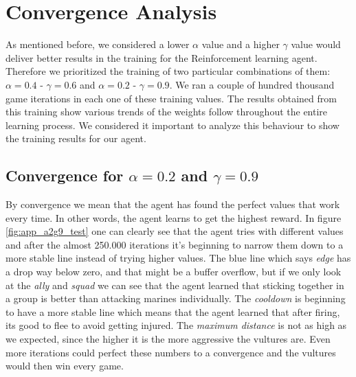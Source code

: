 \section{Convergence Analysis}

As mentioned before, we considered a lower $\alpha$ value and a higher $\gamma$ value would deliver better results in the training for the Reinforcement learning agent. Therefore we prioritized the training of two particular combinations of them: $\alpha= 0.4$ - $\gamma = 0.6$ and $\alpha= 0.2$ - $\gamma = 0.9$. We ran a couple of hundred thousand game iterations in each one of these training values. The results obtained from this training show various trends of the weights follow throughout the entire learning process. We considered it important to analyze this behaviour to show the training results for our agent. \\


\subsection*{Convergence for $\alpha= 0.2$ and $\gamma = 0.9$}

By convergence we mean that the agent has found the perfect values that work every time. In other words, the agent learns to get the highest reward. In figure \ref{fig:app_a2g9_test} one can clearly see that the agent tries with different values and after the almost 250.000 iterations it's beginning to narrow them down to a more stable line instead of trying higher values. The blue line which says \textit{edge} has a drop way below zero, and that might be a buffer overflow, but if we only look at the \textit{ally} and \textit{squad} we can see that the agent learned that sticking together in a group is better than attacking marines individually. The \textit{cooldown} is beginning to have a more stable line which means that the agent learned that after firing, its good to flee to avoid getting injured. The \textit{maximum distance} is not as high as we expected, since the higher it is the more aggressive the vultures are. Even more iterations could perfect these numbers to a convergence and the vultures would then win every game. 


